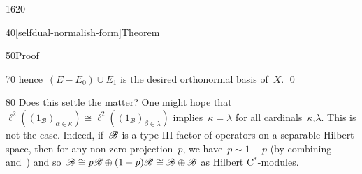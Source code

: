 \begin{parsec}{1620}
\begin{point}{40}[selfdual-normalish-form]{Theorem}
\begin{point}{50}{Proof}
\begin{point}{70}
    hence~$(E - E_0) \cup E_1$ is the desired orthonormal basis of~$X$. \qed
\end{point}
\end{point}
\end{point}
\begin{point}{80}%
Does this settle the matter?
      One might hope
    that~$\ell^2((1_{\mathscr{B}})_{\alpha \in \kappa}) \cong
        \ell^2((1_{\mathscr{B}})_{\beta\in\lambda})$
    implies~$\kappa=\lambda$ for all cardinals~$\kappa$,$\lambda$.
This is not the case.
Indeed, if~$\mathscr{B}$ is a type III factor
    of operators on a separable Hilbert space,
    then for any non-zero projection~$p$,
    we have~$p \sim 1 -p$ (by combining~\cite[Dfn.~6.5.1]{kr}
        and~\cite[Cor.~6.3.5]{kr})
    and so~$\mathscr{B} \cong p\mathscr{B} \oplus (1-p)\mathscr{B} \cong 
    \mathscr{B} \oplus \mathscr{B}$ as Hilbert C$^*$-modules.
\end{point}
\end{parsec}

